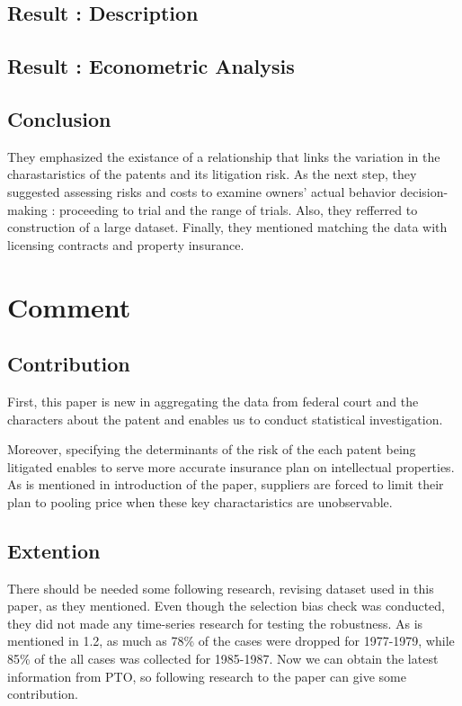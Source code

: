 \documentclass{jsarticle}[12pt]
\begin{document}
  \subsection{Result : Description}
  
  
  
  \subsection{Result : Econometric Analysis}
  
  
  
  \subsection{Conclusion}
  
  They emphasized the existance of a relationship that links the variation in the charastaristics of the patents and its litigation risk. As the next step, they suggested assessing risks and costs to examine owners' actual behavior decision-making : proceeding to trial and the range of trials. Also, they refferred to construction of a large dataset. Finally, they mentioned matching the data with licensing contracts and property insurance.
 
 \section{Comment}
 
 
 
  \subsection{Contribution}
  
  First, this paper is new in aggregating the data from federal court and the characters about the patent and enables us to conduct statistical investigation. 
  
  Moreover, specifying the determinants of the risk of the each patent being litigated enables to serve more accurate insurance plan on intellectual properties. As is mentioned in introduction of the paper, suppliers are forced to limit their plan to pooling price when these key charactaristics are unobservable.
  
  \subsection{Extention}
  
  There should be needed some following research, revising dataset used in this paper, as they mentioned. Even though the selection bias check was conducted, they did not made any time-series research for testing the robustness. As is mentioned in 1.2, as much as 78\% of the cases were dropped for 1977-1979, while 85\% of the all cases was collected for 1985-1987. Now we can obtain the latest information from PTO, so following research to the paper can give some contribution.
  
\end{document}
